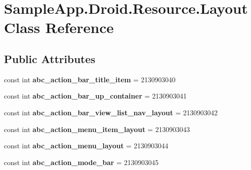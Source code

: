 \hypertarget{class_sample_app_1_1_droid_1_1_resource_1_1_layout}{}\section{Sample\+App.\+Droid.\+Resource.\+Layout Class Reference}
\label{class_sample_app_1_1_droid_1_1_resource_1_1_layout}
\subsection*{Public Attributes}
\begin{DoxyCompactItemize}
\item 
\mbox{\label{class_sample_app_1_1_droid_1_1_resource_1_1_layout_abc2b9031e5739fa020428a770bde26ef}} 
const int {\bfseries abc\+\_\+action\+\_\+bar\+\_\+title\+\_\+item} = 2130903040
\item 
\mbox{\label{class_sample_app_1_1_droid_1_1_resource_1_1_layout_a98193246f6d777b7a1712287b4758fe7}} 
const int {\bfseries abc\+\_\+action\+\_\+bar\+\_\+up\+\_\+container} = 2130903041
\item 
\mbox{\label{class_sample_app_1_1_droid_1_1_resource_1_1_layout_ae3c06dc3633f99ef5883377a37514bfd}} 
const int {\bfseries abc\+\_\+action\+\_\+bar\+\_\+view\+\_\+list\+\_\+nav\+\_\+layout} = 2130903042
\item 
\mbox{\label{class_sample_app_1_1_droid_1_1_resource_1_1_layout_ae44ba3430be09308c4d29ba29eaa2ed0}} 
const int {\bfseries abc\+\_\+action\+\_\+menu\+\_\+item\+\_\+layout} = 2130903043
\item 
\mbox{\label{class_sample_app_1_1_droid_1_1_resource_1_1_layout_a0bb0531d6ae434e9661b8bfaa112930b}} 
const int {\bfseries abc\+\_\+action\+\_\+menu\+\_\+layout} = 2130903044
\item 
\mbox{\label{class_sample_app_1_1_droid_1_1_resource_1_1_layout_af9a9ed9025ae68d581d8bbb4bbba8f19}} 
const int {\bfseries abc\+\_\+action\+\_\+mode\+\_\+bar} = 2130903045

\end{DoxyCompactItemize}
